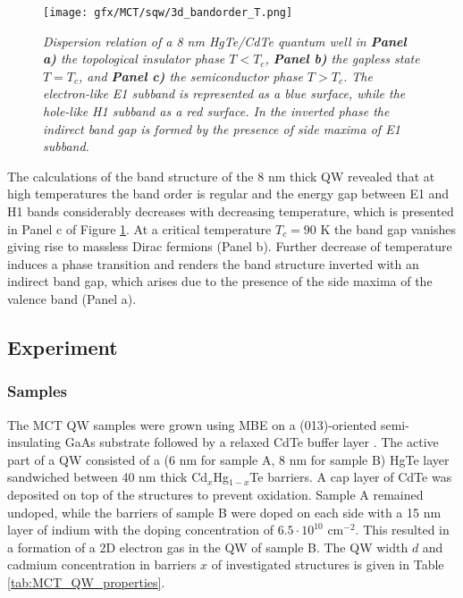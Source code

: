 \documentclass[titlepage,a4paper]{book}
\newcommand{\wciecie}{\quad\phantom{v}}
\begin{document}
\begin{figure}[H]
	\centering
	\texttt{[image: gfx/MCT/sqw/3d\_bandorder\_T.png]}
	\vspace{-10pt}
	\caption{\textit{Dispersion relation of a 8 nm HgTe/CdTe quantum well in \textbf{Panel a)} the topological insulator phase $T < T_c$, \textbf{Panel b)} the gapless state $T = T_c$, and \textbf{Panel c)} the semiconductor phase $T > T_c$. The electron-like E1 subband is represented as a blue surface, while the hole-like H1 subband as a red surface. In the inverted phase the indirect band gap is formed by the presence of side maxima of E1 subband.}}
	\label{fig:3D_bandorder_HgTe}
\end{figure} 

The calculations of the band structure of the 8 nm thick QW revealed that at high temperatures the band order is regular and the energy gap between E1 and H1 bands considerably decreases with decreasing temperature, which is presented in Panel c of Figure \ref{fig:3D_bandorder_HgTe}. At a critical temperature $T_c = 90$ K the band gap vanishes giving rise to massless Dirac fermions (Panel b). Further decrease of temperature induces a phase transition and renders the band structure inverted with an indirect band gap, which arises due to the presence of the side maxima of the valence band (Panel a).

\subsection{Experiment}
\subsubsection{Samples}
\wciecie
The MCT QW samples were grown using MBE on a (013)-oriented semi-insulating GaAs substrate followed by a relaxed CdTe buffer layer \cite{Dvoretsky_Samples}. The active part of a QW consisted of a (6 nm for sample A, 8 nm for sample B) HgTe layer sandwiched between 40 nm thick Cd$_x$Hg$_{1-x}$Te barriers. A cap layer of CdTe was deposited on top of the structures to prevent oxidation. Sample A remained undoped, while the barriers of sample B were doped on each side with a 15 nm layer of indium with the doping concentration of $6.5\cdot10^{10}$ cm$^{-2}$. This resulted in a formation of a 2D electron gas in the QW of sample B. The QW width $d$ and cadmium concentration in barriers $x$ of investigated structures is given in Table \ref{tab:MCT_QW_properties}.   
\end{document}

